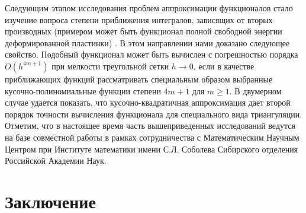 \documentclass[a4paper,11pt,twoside]{article}
\begin{document}
Следующим этапом исследования проблем аппроксимации функционалов стало изучение вопроса степени приближения интегралов, зависящих от вторых производных (примером может быть функционал полной свободной энергии деформированной пластинки) \cite{6}.  В этом направлении нами доказано следующее свойство. Подобный  функционал может быть вычислен с погрешностью порядка $O(h^{4m+1})$    при мелкости треугольной сетки $h\to 0$, если в качестве приближающих функций  рассматривать специальным образом выбранные кусочно-полиномиальные функции степени   $4m+1$ для $m\geq 1$. В двумерном случае удается показать, что кусочно-квадратичная аппроксимация дает второй порядок точности вычисления функционала  для специального вида триангуляции.  
Отметим, что в настоящее время часть вышеприведенных исследований ведутся на  базе совместной работы в рамках сотрудничества с Математическим Научным Центром при Институте математики имени С.Л. Соболева Сибирского отделения Российской Академии Наук.




\section{Заключение}
\end{document}
